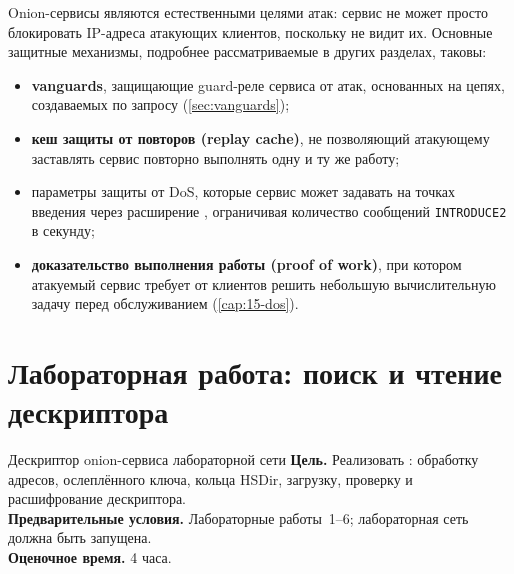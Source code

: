 Onion-сервисы являются естественными целями атак: сервис не может просто блокировать IP-адреса атакующих клиентов, поскольку не видит их. Основные защитные механизмы, подробнее рассматриваемые в других разделах, таковы:
\begin{itemize}
  \item \textbf{vanguards}, защищающие guard-реле сервиса от атак, основанных на цепях, создаваемых по запросу (\cref{sec:vanguards});
  \item \textbf{кеш защиты от повторов (replay cache)}, не позволяющий атакующему заставлять сервис повторно выполнять одну и ту же работу;
  \item параметры защиты от DoS, которые сервис может задавать на точках введения через расширение , ограничивая количество сообщений \texttt{INTRODUCE2} в секунду;
  \item \textbf{доказательство выполнения работы (proof of work)}, при котором атакуемый сервис требует от клиентов решить небольшую вычислительную задачу перед обслуживанием (\cref{cap:15-dos}).
\end{itemize}

\section{Лабораторная работа: поиск и чтение дескриптора}\label{sec:lab-onion}

\begin{laboratorio}[8]{Дескриптор onion-сервиса лабораторной сети}
\textbf{Цель.} Реализовать : обработку адресов, ослеплённого ключа, кольца HSDir, загрузку, проверку и расшифрование дескриптора.\\
\textbf{Предварительные условия.} Лабораторные работы~1--6; лабораторная сеть должна быть запущена.\\
\textbf{Оценочное время.} 4 часа.
\end{laboratorio}

